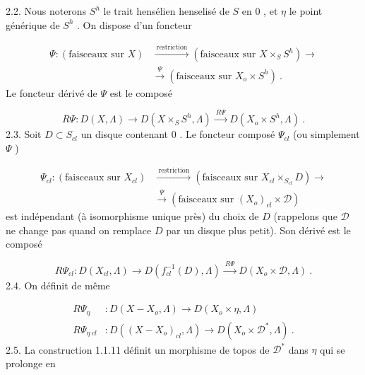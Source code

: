 
2.2. Nous noterons $S^h$ le trait hensélien henselisé de $S$ en $0$ , et $\eta$ le point générique de $S^h$ . On dispose d'un foncteur

\begin{equation*}
\begin{aligned}
\Psi : (\text{faisceaux sur } X) &\xrightarrow{\ \text{restriction}\ } (\text{faisceaux sur } X \times_S S^h) \longrightarrow \\
&\xrightarrow{\ \Psi\ } (\text{faisceaux sur } X_o \times S^h) \ .
\end{aligned}
\end{equation*}
Le foncteur dérivé de $\Psi$ est le composé

\begin{equation*}
R\Psi : D(X, \Lambda) \longrightarrow D(X \times_S S^h, \Lambda) \xrightarrow{\ R\Psi\ } D(X_o \times S^h, \Lambda) \ .
\end{equation*}
2.3. Soit $D \subset S_{cl}$ un disque contenant $0$ . Le foncteur composé $\Psi_{cl}$ (ou simplement $\Psi$ )

\begin{equation*}
\begin{aligned}
\Psi_{cl} : (\text{faisceaux sur } X_{cl}) &\xrightarrow{\ \text{restriction}\ } (\text{faisceaux sur } X_{cl} \times_{S_{cl}} D) \longrightarrow \\
&\xrightarrow{\ \Psi\ } (\text{faisceaux sur } (X_o)_{cl} \times \mathcal{D})
\end{aligned}
\end{equation*}
est indépendant (à isomorphisme unique près) du choix de $D$ (rappelons que $\mathcal{D}$ ne change pas quand on remplace $D$ par un disque plus petit). Son dérivé est le composé

\begin{equation*}
R\Psi_{cl} : D(X_{cl}, \Lambda) \longrightarrow D(f_{cl}^{-1}(D), \Lambda) \xrightarrow{\ R\Psi\ } D(X_o \times \mathcal{D}, \Lambda) \ .
\end{equation*}
2.4. On définit de même

\begin{equation*}
\begin{aligned}
R\Psi_{\eta} &: D(X-X_o, \Lambda) \longrightarrow D(X_o \times \eta, \Lambda) \\
R\Psi_{\eta\ cl} &: D((X-X_o)_{cl}, \Lambda) \longrightarrow D(X_o \times \mathcal{D}^*, \Lambda) \ .
\end{aligned}
\end{equation*}
2.5. La construction 1.1.11 définit un morphisme de topos de $\mathcal{D}^*$ dans $\eta$ qui se prolonge en

